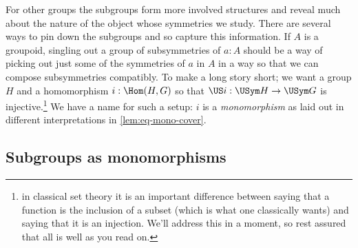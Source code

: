 For other groups the subgroups form more involved structures and reveal much about the nature of the object whose symmetries we study.
There are several ways to pin down the subgroups and so capture this information.
If $A$ is a groupoid, singling out a group of subsymmetries of $a:A$ should be a way of picking out just some of the symmetries of $a$ in $A$ in a way so that we can compose subsymmetries compatibly.  To make a long story short; we want a group $H$ and a homomorphism $i:\Hom(H,G)$ so that $\US i:\USym H\to\USym G$ is injective.\footnote{in classical set theory it is an important difference between saying that a function is the inclusion of a subset (which is what one classically wants) and saying that it is an injection.  We'll address this in a moment, so rest assured that all is well as you read on.}  We have a name for such a setup: $i$ is a \emph{monomorphism} as laid out in different interpretations in \cref{lem:eq-mono-cover}.

\subsection{Subgroups as monomorphisms}

